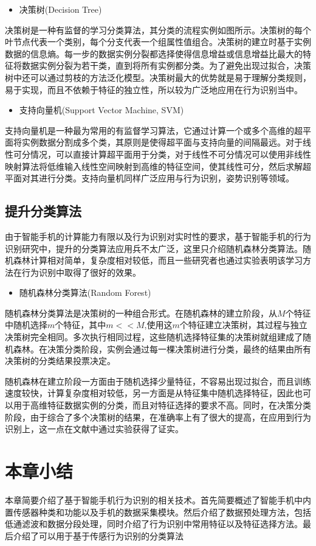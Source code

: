 \begin{itemize}
	\item 决策树(Decision Tree)
\end{itemize}
\par 决策树是一种有监督的学习分类算法，其分类的流程实例如图所示。决策树的每个叶节点代表一个类别，每个分支代表一个组属性值组合。决策树的建立时基于实例数据的信息熵。每一步的数据实例分裂都选择使得信息增益或信息增益比最大的特征将数据实例分裂为若干类，直到将所有实例都分类。为了避免出现过拟合，决策树中还可以通过剪枝的方法泛化模型。决策树最大的优势就是易于理解分类规则，易于实现，而且不依赖于特征的独立性，所以较为广泛地应用在行为识别当中。
\begin{itemize}
	\item 支持向量机(Support Vector Machine, SVM)
\end{itemize}
\par 支持向量机是一种最为常用的有监督学习算法，它通过计算一个或多个高维的超平面将实例数据分割成多个类，其原则是使得超平面与支持向量的间隔最远。对于线性可分情况，可以直接计算超平面用于分类，对于线性不可分情况可以使用非线性映射算法将低维输入线性空间映射到高维的特征空间，使其线性可分，然后求解超平面对其进行分类。支持向量机同样广泛应用与行为识别，姿势识别等领域。

\subsection{提升分类算法}
\par 由于智能手机的计算能力有限以及行为识别对实时性的要求，基于智能手机的行为识别研究中，提升的分类算法应用兵不太广泛，这里只介绍随机森林分类算法。随机森林计算相对简单，复杂度相对较低，而且一些研究者也通过实验表明该学习方法在行为识别中取得了很好的效果。
\begin{itemize}
	\item 随机森林分类算法(Random Forest)
\end{itemize}
\par 随机森林分类算法是决策树的一种组合形式。在随机森林的建立阶段，从$M$个特征中随机选择$m$个特征，其中$m<<M$,使用这$m$个特征建立决策树，其过程与独立决策树完全相同。多次执行相同过程，这些随机选择特征集的决策树就组建成了随机森林。在决策分类阶段，实例会通过每一棵决策树进行分类，最终的结果由所有决策树的分类结果投票决定。
\par 随机森林在建立阶段一方面由于随机选择少量特征，不容易出现过拟合，而且训练速度较快，计算复杂度相对较低，另一方面是从特征集中随机选择特征，因此也可以用于高维特征数据实例的分类，而且对特征选择的要求不高。同时，在决策分类阶段，由于综合了多个决策树的结果，在准确率上有了很大的提高，在应用到行为识别上，这一点在文献中通过实验获得了证实。

\section{本章小结}
\par 本章简要介绍了基于智能手机行为识别的相关技术。首先简要概述了智能手机中内置传感器种类和功能以及手机的数据采集模块。然后介绍了数据预处理方法，包括低通滤波和数据分段处理，同时介绍了行为识别中常用特征以及特征选择方法。最后介绍了可以用于基于传感行为识别的分类算法